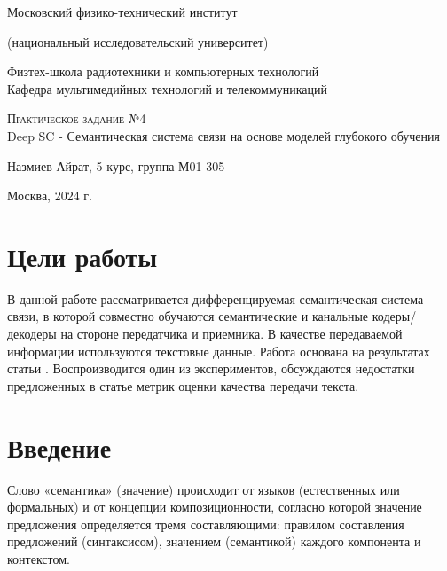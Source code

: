 \documentclass[a4paper,12pt]{article}
\begin{document}
	
	\begin{titlepage}
		\begin{center}
			
			\vspace{0.5cm}
			\large
			Московский физико-технический институт 
			
			(национальный исследовательский университет)
			\vspace{0.25cm}
			
			Физтех-школа радиотехники и компьютерных технологий \\
			
			Кафедра мультимедийных технологий и телекоммуникаций
			\vfill
			
			\textsc{Практическое задание №4}\\[5mm]
			
			{\LARGE Deep SC - Семантическая система связи на основе моделей глубокого обучения}
			\bigskip
			
			Назмиев Айрат, 5 курс, группа М01-305
		\end{center}
		\vfill
		
		\newlength{\ML}
		
		\vfill
		\vfill
		
		\begin{center}
			Москва, 2024 г.
		\end{center}
		
	\end{titlepage}
	
	\section*{Цели работы}
	В данной работе рассматривается дифференцируемая семантическая система связи, в которой совместно обучаются семантические и канальные кодеры/декодеры на стороне передатчика и приемника. В качестве передаваемой информации используются текстовые данные. Работа основана на результатах статьи \cite{xie2021sem}. Воспроизводится один из экспериментов, обсуждаются недостатки предложенных в статье метрик оценки качества передачи текста.
	
	\section*{Введение}
	Слово «семантика» (значение) происходит от языков (естественных или формальных) и от концепции композиционности, согласно которой значение предложения определяется тремя составляющими: правилом составления предложений (синтаксисом), значением (семантикой) каждого компонента и контекстом.
	
\end{document}
